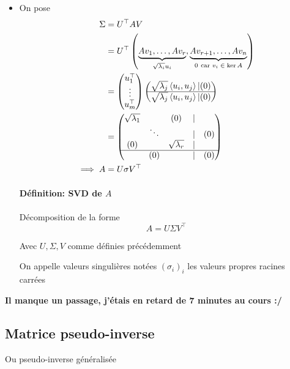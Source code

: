 \documentclass{article}
\newenvironment{definition}[1][\unskip]{
	\paragraph{Définition: #1}

}{}
\begin{document}
\begin{itemize}
		 \item  On pose \begin{align*}
		 	\Sigma &= U^\top AV \\
			       &= U^\top \left(\underbrace{Av_1, \ldots, Av_r}_{\sqrt{\lambda_i} u_i }, \underbrace{A v_{r+1}, \ldots, A v_n}_{0\ \text{car $v_i \in \ker A$}}\right) \\
			       &= \begin{pmatrix} u_1^\top \\ \vdots \\ u_m^\top \end{pmatrix} \begin{pmatrix} \sqrt{\lambda_j}  \left<u_i, u_j \right> | (0) \\ \hline \sqrt{\lambda_j} \left<u_i, u_j \right> | (0) \end{pmatrix}   \\
			       &= \begin{pmatrix} \sqrt{\lambda_1} &  & (0) &  | & \\  & \ddots &  & |  & (0) \\  (0) &  & \sqrt{\lambda_r}  & | & \\ \hline & (0) & & | & (0) \end{pmatrix}  \\
			       \implies A &= U \sigma V^\top \\
		 \end{align*}


		 \begin{definition}[SVD de $A$]
		 	Décomposition de la forme \[
		 		A = U \Sigma V^\top
		 	\] 

			Avec $U, \Sigma, V$ comme définies précédemment

			On appelle valeurs singulières notées  $(\sigma_i)_i$ les valeurs propres racines carrées
		 \end{definition}


\end{itemize}



\begin{center}
    {\Large\bf Il manque un passage, j'étais en retard de 7 minutes au cours :/}
\end{center}

\subsection{Matrice pseudo-inverse}
Ou pseudo-inverse généralisée
\end{document}

